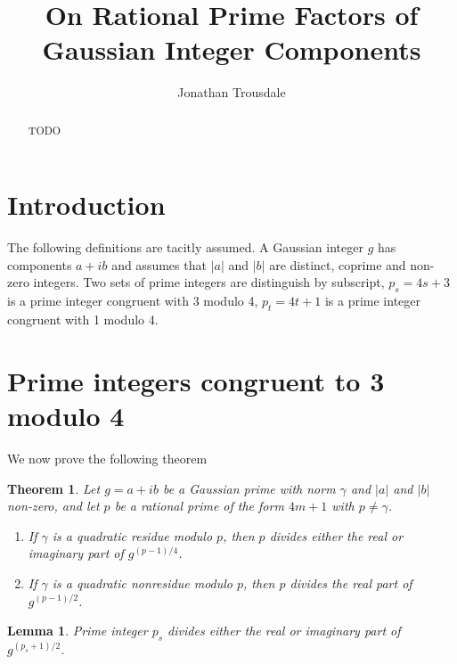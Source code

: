 \documentclass[oneside,english,man]{amsart}
\numberwithin{equation}{section}
\numberwithin{figure}{section}
\newtheorem{theorem}{Theorem}
\newtheorem{lemma}{Lemma}[theorem]
\begin{document}
\title{On Rational Prime Factors of Gaussian Integer Components}
\author{Jonathan Trousdale}
\maketitle

\begin{abstract}
	TODO
\end{abstract}


\section{Introduction}


The following definitions are tacitly assumed. A Gaussian integer $g$ has components $a+ib$ and assumes that $\vert a \vert$ and $\vert b \vert$ are distinct, coprime and non-zero integers.  Two sets of prime integers are distinguish by subscript, $p_s = 4s+3$ is a prime integer congruent with 3 modulo 4, $p_t = 4t+1$ is a prime integer congruent with 1 modulo 4.

\section{Prime integers congruent to 3 modulo 4}
We now prove the following theorem

\begin{theorem} \label{thm:p_3}
	Let $g=a+ib$ be a Gaussian prime with norm $\gamma$ and $\vert a\vert$ and $\vert b\vert$ non-zero, and let $p$ be a rational prime of the form $4m+1$ with $p\neq \gamma$.
	\begin{enumerate}[label={(\roman*)}]
		\item If $\gamma$ is a quadratic residue modulo $p$, then $p$ divides either the real or imaginary part of $g^{(p-1)/4}$. \label{thm:p_3_residue}
		\item If $\gamma$ is a quadratic nonresidue modulo $p$, then $p$ divides the real part of $g^{(p-1)/2}$. \label{thm:p_3_nonresidue}
	\end{enumerate}
\end{theorem}

\begin{lemma}
	Prime integer $p_s$ divides either the real or imaginary part of $g^{(p_s+1)/2}$.
\end{lemma}
\end{document}
